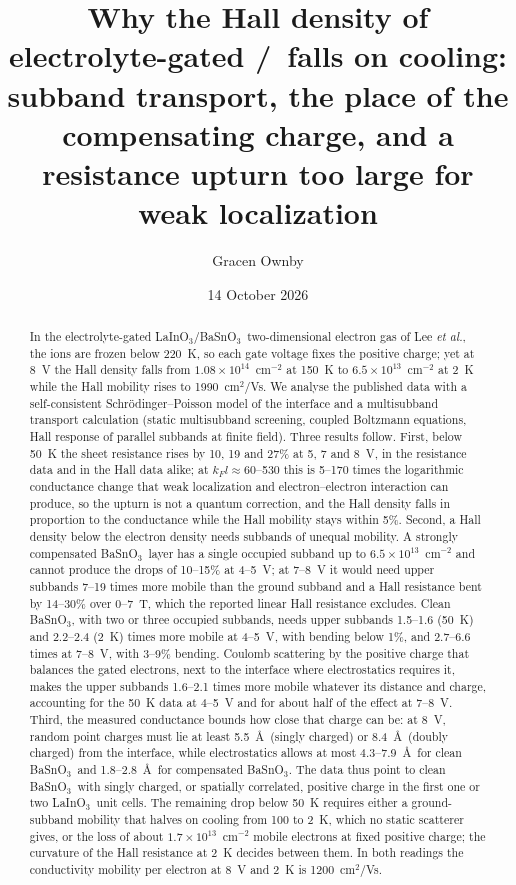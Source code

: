 \documentclass[11pt]{article}
\title{Why the Hall density of electrolyte-gated \LIO/\BSO\ falls on cooling: subband transport, the place of the compensating charge, and a resistance upturn too large for weak localization}
\author{Gracen Ownby}
\affil{University of Oklahoma, Norman, Oklahoma, USA}
\date{\small 14 October 2026}
\newcommand{\LIO}{\texorpdfstring{LaInO$_3$}{LaInO3}}
\newcommand{\BSO}{\texorpdfstring{BaSnO$_3$}{BaSnO3}}
\begin{document}
\maketitle

\begin{abstract}
In the electrolyte-gated \LIO/\BSO\ two-dimensional electron gas of Lee \emph{et al.}, the ions are frozen below 220~K, so each gate voltage fixes the positive charge; yet at 8~V the Hall density falls from $1.08\times10^{14}$~cm$^{-2}$ at 150~K to $6.5\times10^{13}$~cm$^{-2}$ at 2~K while the Hall mobility rises to 1990~cm$^2$/Vs. We analyse the published data with a self-consistent Schr\"odinger--Poisson model of the interface and a multisubband transport calculation (static multisubband screening, coupled Boltzmann equations, Hall response of parallel subbands at finite field). Three results follow. First, below 50~K the sheet resistance rises by 10, 19 and 27\% at 5, 7 and 8~V, in the resistance data and in the Hall data alike; at $k_Fl\approx60$--530 this is 5--170 times the logarithmic conductance change that weak localization and electron--electron interaction can produce, so the upturn is not a quantum correction, and the Hall density falls in proportion to the conductance while the Hall mobility stays within 5\%. Second, a Hall density below the electron density needs subbands of unequal mobility. A strongly compensated \BSO\ layer has a single occupied subband up to $6.5\times10^{13}$~cm$^{-2}$ and cannot produce the drops of 10--15\% at 4--5~V; at 7--8~V it would need upper subbands 7--19 times more mobile than the ground subband and a Hall resistance bent by 14--30\% over 0--7~T, which the reported linear Hall resistance excludes. Clean \BSO, with two or three occupied subbands, needs upper subbands 1.5--1.6 (50~K) and 2.2--2.4 (2~K) times more mobile at 4--5~V, with bending below 1\%, and 2.7--6.6 times at 7--8~V, with 3--9\% bending. Coulomb scattering by the positive charge that balances the gated electrons, next to the interface where electrostatics requires it, makes the upper subbands 1.6--2.1 times more mobile whatever its distance and charge, accounting for the 50~K data at 4--5~V and for about half of the effect at 7--8~V. Third, the measured conductance bounds how close that charge can be: at 8~V, random point charges must lie at least 5.5~\AA\ (singly charged) or 8.4~\AA\ (doubly charged) from the interface, while electrostatics allows at most 4.3--7.9~\AA\ for clean \BSO\ and 1.8--2.8~\AA\ for compensated \BSO. The data thus point to clean \BSO\ with singly charged, or spatially correlated, positive charge in the first one or two \LIO\ unit cells. The remaining drop below 50~K requires either a ground-subband mobility that halves on cooling from 100 to 2~K, which no static scatterer gives, or the loss of about $1.7\times10^{13}$~cm$^{-2}$ mobile electrons at fixed positive charge; the curvature of the Hall resistance at 2~K decides between them. In both readings the conductivity mobility per electron at 8~V and 2~K is 1200~cm$^2$/Vs.
\end{abstract}
\end{document}
